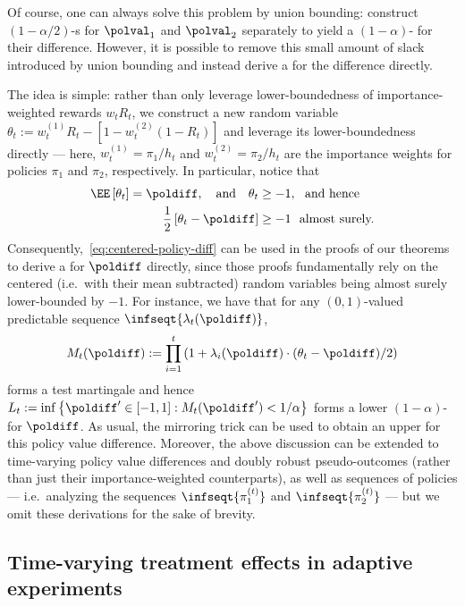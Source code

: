 Of course, one can always solve this problem by union bounding: construct $(1-\alpha/2)$-\cs{}s for $\polval_1$ and $\polval_2$ separately to yield a $(1-\alpha)$-\cs{} for their difference. However, it is possible to remove this small amount of slack introduced by union bounding and instead derive a \cs{} for the difference directly.

The idea is simple: rather than only leverage lower-boundedness of importance-weighted rewards $w_tR_t$, we construct a new random variable $\theta_t := w_t^{(1)}R_t - [1 - w_t^{(2)}(1-R_t)]$ and leverage its lower-boundedness directly --- here, $w_t^{(1)} = \pi_1 / h_t$ and $w_t^{(2)} = \pi_2 / h_t$ are the importance weights for policies $\pi_1$ and $\pi_2$, respectively. In particular, notice that
\begin{align}
  \EE \left [ \theta_t \right ] = \poldiff, ~~~\text{and}~~~ \theta_t &\geq -1, ~~\text{and hence}\\
  \frac{1}{2} \left [ \theta_t - \poldiff  \right ] &\geq - 1~~\text{almost surely.}\label{eq:centered-policy-diff}
\end{align}
Consequently,~\eqref{eq:centered-policy-diff} can be used in the proofs of our theorems to derive a \cs{} for $\poldiff$ directly, since those proofs fundamentally rely on the centered (i.e.~with their mean subtracted) random variables being almost surely lower-bounded by $-1$. For instance, we have that for any $(0, 1)$-valued predictable sequence $\infseqt{\lambda_t(\poldiff)}$, 
\begin{equation}
  M_t(\poldiff) := \prod_{i=1}^t \left ( 1 + \lambda_i(\poldiff) \cdot (\theta_t - \poldiff)/2 \right )
\end{equation}
forms a test martingale and hence $L_t := \inf \left \{ \poldiff' \in [-1, 1] : M_t(\poldiff') < 1/\alpha \right \}$ forms a lower $(1-\alpha)$-\cs{} for $\poldiff$.
As usual, the mirroring trick can be used to obtain an upper \cs{} for this policy value difference. Moreover, the above discussion can be extended to time-varying policy value differences and doubly robust pseudo-outcomes (rather than just their importance-weighted counterparts), as well as sequences of policies --- i.e.~analyzing the sequences $\infseqt{\pi_1^{(t)}}$ and $\infseqt{\pi_2^{(t)}}$ --- but we omit these derivations for the sake of brevity.


\subsection{Time-varying treatment effects in adaptive experiments}\label{section:ate-randomized-expts}


